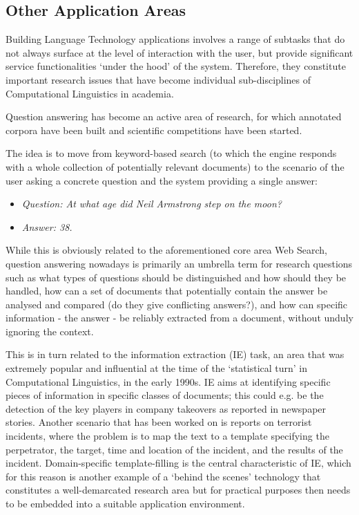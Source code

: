 \begin{multicols}{2}
\subsection{Other Application Areas}

Building Language Technology applications involves a range of subtasks that do not always surface at the level of interaction with the user, but provide significant service functionalities ‘under the hood’ of the system. Therefore, they constitute important research issues that have become individual sub-disciplines of Computational Linguistics in academia. 

Question answering has become an active area of research, for which annotated corpora have been built and scientific competitions have been started.

The idea is to move from keyword-based search (to which the engine responds with a whole collection of potentially relevant documents) to the scenario of the user asking a concrete question and the system providing a single answer: \\
\begin{itemize}
\item[] \textit{Question: At what age did Neil Armstrong step on the moon?}
\item[] \textit{Answer: 38.}
\end{itemize}

While this is obviously related to the aforementioned core area Web Search, question answering nowadays is primarily an umbrella term for research questions such as what types of questions should be distinguished and how should they be handled, how can a set of documents that potentially contain the answer be analysed and compared (do they give conflicting answers?), and how can specific information - the answer - be reliably extracted from a document, without unduly ignoring the context. 


This is in turn related to the information extraction (IE) task, an area that was extremely popular and influential at the time of the ‘statistical turn’ in Computational Linguistics, in the early 1990s. IE aims at identifying specific pieces of information in specific classes of documents; this could e.g. be the detection of the key players in company takeovers as reported in newspaper stories. Another scenario that has been worked on is reports on terrorist incidents, where the problem is to map the text to a template specifying the perpetrator, the target, time and location of the incident, and the results of the incident. Domain-specific template-filling is the central characteristic of IE, which for this reason is another example of a ‘behind the scenes’ technology that constitutes a well-demarcated research area but for practical purposes then needs to be embedded into a suitable application environment. 


\end{multicols}
